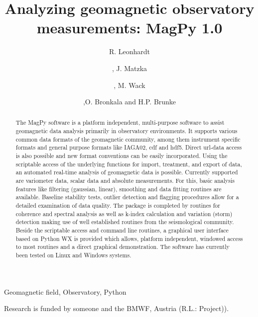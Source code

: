 \documentclass{elsart}
\begin{document}
\begin{frontmatter}


\title{Analyzing geomagnetic observatory measurements: MagPy 1.0}

\author[ZAMG]{R. Leonhardt}
\author[DTU]{, J. Matzka}
\author[LMU]{, M. Wack}
\author[GFZ]{,O. Bronkala and H.P. Brunke}

\address[ZAMG]{Conrad Observatory, Zentralanstalt f\"ur Meteorologie und Geodynamik, Vienna, Austria}
\address[DTU]{National Space Institute (DTU Space), Technical University of Denmark, Copenhagen, Denmark}
\address[LMU]{Department Geowissenschaften, Ludwig-Maximilians-Universit\"at, Munich, Germany}
\address[GFZ]{Observatory, GFZ Potsdam, Niemegk, Germany}


\begin{abstract}
The MagPy software is a platform independent, multi-purpose software to assist geomagnetic data analysis primarily in observatory environments. It supports various common data formats of the geomagnetic community, among them instrument specific formats and general purpose formats like IAGA02, cdf and hdf5. Direct url-data access is also possible and new format conventions can be easily incorporated. Using the scriptable access of the underlying functions for import,  treatment, and export of data, an automated real-time analysis of geomagnetic data is possible. Currently supported are variometer data, scalar data and absolute measurements. For this, basic analysis features like filtering (gaussian, linear), smoothing and data fitting routines are available. Baseline stability tests, outlier detection and flagging procedures allow for a detailed examination of data quality. The package is completed by routines for coherence and spectral analysis as well as k-index calculation and variation (storm) detection making use of well established routines from the seismological community. Beside the scriptable access and command line routines, a graphical user interface based on Python WX is provided which allows, platform independent, windowed access to most routines and a direct graphical demonstration. The software has currently been tested on Linux and Windows systems.
\end{abstract}

\begin{keyword}
Geomagnetic field, Observatory, Python
\end{keyword}
\end{frontmatter}



\begin{ack}
Research is funded by someone and the BMWF, Austria (R.L.: Project)).
\end{ack}

{}
%

%
%
\end{document}
